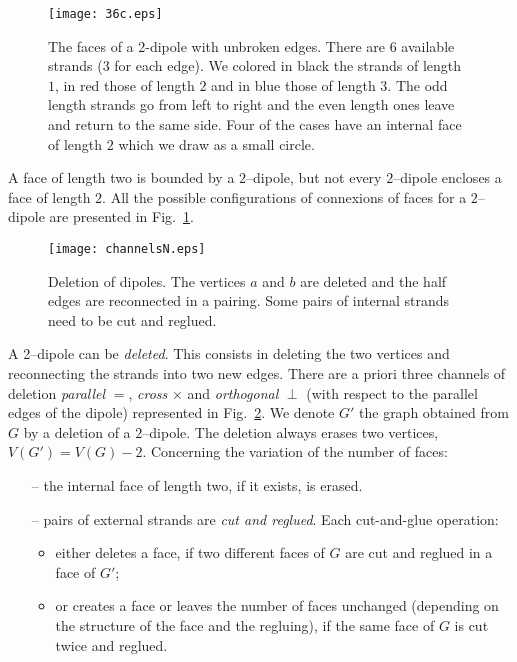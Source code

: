 \documentclass[10pt]{article}
\theoremstyle{plain}
\theoremstyle{definition}
\begin{document}
 \begin{figure}[htb]
 \begin{center}
 \texttt{[image: 36c.eps]}  
 \caption{The faces of a 2-dipole with unbroken edges. There are $6$ available 
 strands (3 for each edge). We colored in black the strands of length $1$, in red those of length $2$ and in blue those of length $3$. The
 odd length strands go from left to right and the even length ones 
 leave and return to the same side. Four of the cases have an internal face of length $2$ which we draw as a small circle. } \label{fig:36}
 \end{center}
 \end{figure}

 A face of length two is bounded by a $2$--dipole, but not every $2$--dipole encloses a face of length $2$. 
All the possible configurations of connexions of faces for a $2$--dipole are presented in Fig.~\ref{fig:36}.

  \begin{figure}[htb]
 \begin{center}
 \texttt{[image: channelsN.eps]}  
 \caption{Deletion of dipoles. The vertices $a$ and $b$ are deleted and the half edges are reconnected in a pairing. Some pairs of internal strands 
 need to be cut and reglued.} \label{fig:channels}
 \end{center}
 \end{figure}

 A 2--dipole can be \emph{deleted}. This consists in deleting the two vertices and reconnecting the strands into two new edges. 
 There are a priori three channels of deletion \emph{parallel} $=$, \emph{cross} $\times$ and \emph{orthogonal} $\perp$ (with respect to the parallel edges of the dipole)
 represented in Fig.~\ref{fig:channels}. We denote $G'$ the graph obtained from $G$ by a deletion of a 
 $2$--dipole. The deletion always erases two vertices, $V(G') = V(G)-2$. Concerning the variation of the number of faces:
\begin{itemize}
 \item[--] the internal face of length two, if it exists, is erased.
 \item[--] pairs of external strands are \emph{cut and reglued}. Each cut-and-glue operation:
  \begin{itemize}
   \item either deletes a face, if two different faces of $G$ are cut and reglued in a face of $G'$;
   \item or creates a face or leaves the number of faces unchanged (depending on the structure of the face and the regluing), if the same face of $G$ is cut twice and reglued.
  \end{itemize}
\end{itemize}
\end{document}
